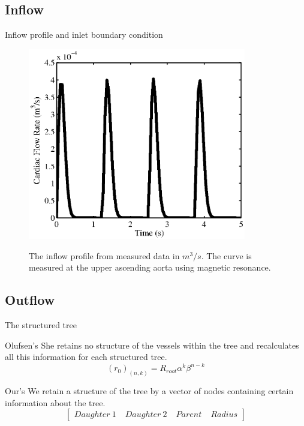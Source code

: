 \documentclass{beamer}
\begin{document}

\subsection{Inflow}
\begin{frame}{Inflow profile and inlet boundary condition}

\begin{figure}[ht]
	\includegraphics[width=3.75in]{inflow}
	\label{inflower}
	\caption{The inflow profile from measured data in $m^3/s$. The curve is measured at the upper ascending aorta using magnetic resonance.}
\end{figure}

\end{frame}

\subsection{Outflow}
\begin{frame}{The structured tree}
	\begin{block}{Olufsen's}
		She retains no structure of the vessels within the tree and recalculates all this information for each structured tree.	
		\begin{equation}
			\label{radius}
			(r_0)_(n,k) = R_{root} \alpha^k\beta^{n-k}
		\end{equation}
	\end{block}
	
	\begin{block}{Our's}
		We retain a structure of the tree by a vector of nodes containing certain information about the tree. 
		\begin{equation}
			\begin{bmatrix}
			Daughter \: 1 \; & Daughter \: 2 \; & Parent \; & Radius 
			\end{bmatrix}
		\end{equation}
	\end{block}
		
\end{frame}
\end{document}

